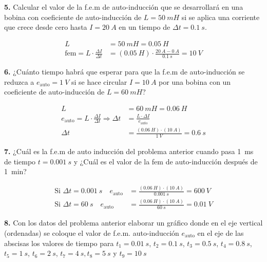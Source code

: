 \documentclass[../main]{subfiles}
\begin{document}
\noindent\textbf{5.} Calcular el valor de la f.e.m de auto-inducción que se desarrollará en una bobina con coeficiente de auto-inducción de $L = \qty{50}{mH}$ si se aplica una corriente que crece desde cero hasta $I = \qty{20}{A}$ en un tiempo de $\Delta t = \qty{0,1}{s}$.

\begin{align*}
L &= \qty{50}{mH} = \qty{0,05}{H} \\
\text{fem} = L \cdot \frac{\Delta I}{\Delta t} &= (\qty{0,05}{H}) \cdot \frac{\qty{20}{A} - \qty{0}{A}}{\qty{0,1}{s}} = \boxed{\qty{10}{V}}
\end{align*}

\noindent\textbf{6.} ¿Cuánto tiempo habrá que esperar para que la f.e.m de auto-inducción se reduzca a $e_{\text{auto}} = \qty{1}{V}$ si se hace circular $I = \qty{10}{A}$ por una bobina con un coeficiente de auto-inducción de $L = \qty{60}{mH}$?

\begin{align*}
L &= \qty{60}{mH} = \qty{0,06}{H} \\
e_{\text{auto}} = L \cdot \frac{\Delta I}{\Delta t} \Rightarrow \Delta t &= \frac{L \cdot \Delta I}{e_{\text{auto}}} \\
\Delta t &= \frac{(\qty{0,06}{H}) \cdot (\qty{10}{A})}{\qty{1}{V}} = \boxed{\qty{0,6}{s}}
\end{align*}

\noindent\textbf{7.} ¿Cuál es la f.e.m de auto inducción del problema anterior cuando pasa \qty{1}{ms} de tiempo $t=\qty{0,001}{s}$ y ¿Cuál es el valor de la fem de auto-inducción después de \qty{1}{min}?

\begin{align*}
\text{Si } \Delta t = \qty{0,001}{s} \quad e_{\text{auto}} &= \frac{(\qty{0,06}{H}) \cdot (\qty{10}{A})}{\qty{0,001}{s}} = \boxed{\qty{600}{V}} \\
\text{Si } \Delta t = \qty{60}{s} \quad e_{\text{auto}} &= \frac{(\qty{0,06}{H}) \cdot (\qty{10}{A})}{\qty{60}{s}} = \boxed{\qty{0,01}{V}}
\end{align*}

\noindent\textbf{8.} Con los datos del problema anterior elaborar un gráfico donde en el eje vertical (ordenadas) se coloque el valor de f.e.m. auto-inducción $e_{\text{auto}}$ en el eje de las abscisas los valores de tiempo para $t_1=\qty{0,01}{s}$, $t_2=\qty{0,1}{s}$, $t_3=\qty{0,5}{s}$, $t_4=\qty{0,8}{s}$, $t_5=\qty{1}{s}$, $t_6=\qty{2}{s}$, $t_7=\qty{4}{s}, t_8=\qty{5}{s}$ y $t_9=\qty{10}{s}$
\end{document}
